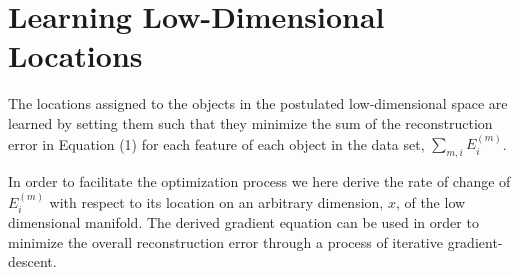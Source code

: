 \documentclass[11pt]{article} %
\begin{document}
\section{Learning Low-Dimensional Locations}

The locations assigned to the objects in the postulated low-dimensional space are learned by setting them such that they minimize the sum of the reconstruction error in Equation (1) for each feature of each object in the data set, $\sum_{m, i} E^{(m)}_i$.

In order to facilitate the optimization process we here derive the rate of change of $E^{(m)}_i$ with respect to its location on an arbitrary dimension, $x$, of the low dimensional manifold. The derived gradient equation can be used in order to minimize the overall reconstruction error through a process of iterative gradient-descent.
\end{document}
